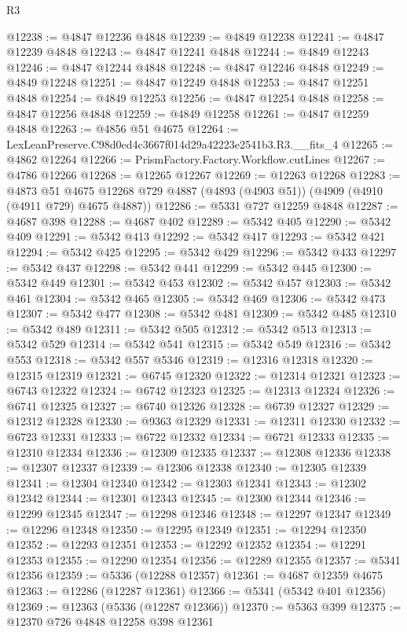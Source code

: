 \begin{lexlean}{R3}
\begin{coremodule}
@12238 := @4847 @12236 @4848
@12239 := @4849 @12238
@12241 := @4847 @12239 @4848
@12243 := @4847 @12241 @4848
@12244 := @4849 @12243
@12246 := @4847 @12244 @4848
@12248 := @4847 @12246 @4848
@12249 := @4849 @12248
@12251 := @4847 @12249 @4848
@12253 := @4847 @12251 @4848
@12254 := @4849 @12253
@12256 := @4847 @12254 @4848
@12258 := @4847 @12256 @4848
@12259 := @4849 @12258
@12261 := @4847 @12259 @4848
@12263 := @4856 @51 @4675
@12264 := LexLeanPreserve.C98d0ed4c3667f014d29a42223e2541b3.R3.__fits_4
@12265 := @4862 @12264
@12266 := PrismFactory.Factory.Workflow.cutLines
@12267 := @4786 @12266
@12268 := @12265 @12267
@12269 := @12263 @12268
@12283 := @4873
    @51
    @4675
    @12268
    @729
    @4887
    (@4893 (@4903 @51))
    (@4909 (@4910 (@4911 @729) @4675 @4887))
@12286 := @5331 @727 @12259 @4848
@12287 := @4687 @398
@12288 := @4687 @402
@12289 := @5342 @405
@12290 := @5342 @409
@12291 := @5342 @413
@12292 := @5342 @417
@12293 := @5342 @421
@12294 := @5342 @425
@12295 := @5342 @429
@12296 := @5342 @433
@12297 := @5342 @437
@12298 := @5342 @441
@12299 := @5342 @445
@12300 := @5342 @449
@12301 := @5342 @453
@12302 := @5342 @457
@12303 := @5342 @461
@12304 := @5342 @465
@12305 := @5342 @469
@12306 := @5342 @473
@12307 := @5342 @477
@12308 := @5342 @481
@12309 := @5342 @485
@12310 := @5342 @489
@12311 := @5342 @505
@12312 := @5342 @513
@12313 := @5342 @529
@12314 := @5342 @541
@12315 := @5342 @549
@12316 := @5342 @553
@12318 := @5342 @557 @5346
@12319 := @12316 @12318
@12320 := @12315 @12319
@12321 := @6745 @12320
@12322 := @12314 @12321
@12323 := @6743 @12322
@12324 := @6742 @12323
@12325 := @12313 @12324
@12326 := @6741 @12325
@12327 := @6740 @12326
@12328 := @6739 @12327
@12329 := @12312 @12328
@12330 := @9363 @12329
@12331 := @12311 @12330
@12332 := @6723 @12331
@12333 := @6722 @12332
@12334 := @6721 @12333
@12335 := @12310 @12334
@12336 := @12309 @12335
@12337 := @12308 @12336
@12338 := @12307 @12337
@12339 := @12306 @12338
@12340 := @12305 @12339
@12341 := @12304 @12340
@12342 := @12303 @12341
@12343 := @12302 @12342
@12344 := @12301 @12343
@12345 := @12300 @12344
@12346 := @12299 @12345
@12347 := @12298 @12346
@12348 := @12297 @12347
@12349 := @12296 @12348
@12350 := @12295 @12349
@12351 := @12294 @12350
@12352 := @12293 @12351
@12353 := @12292 @12352
@12354 := @12291 @12353
@12355 := @12290 @12354
@12356 := @12289 @12355
@12357 := @5341 @12356
@12359 := @5336 (@12288 @12357)
@12361 := @4687 @12359 @4675
@12363 := @12286 (@12287 @12361)
@12366 := @5341 (@5342 @401 @12356)
@12369 := @12363 (@5336 (@12287 @12366))
@12370 := @5363 @399
@12375 := @12370 @726 @4848 @12258 @398 @12361

\end{coremodule}
\end{lexlean}
